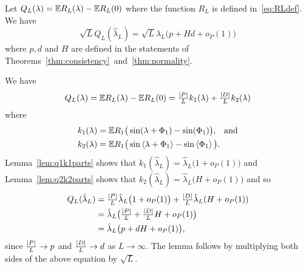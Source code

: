 \documentclass[journal]{IEEEtran}
\begin{document}
\begin{lemma}\label{lem:Qconv}
Let $Q_L(\lambda) = {\mathbb E} R_L(\lambda) - {\mathbb E} R_L(0)$ where the function $R_L$ is defined in~\eqref{eq:RLdef}.  We have
\[ 
\sqrt{L} Q_L(\hat{\lambda}_L) = \sqrt{L} \hat{\lambda}_L\big( p + Hd  + o_P(1) \big)
\]
where $p, d$ and $H$ are defined in the statements of Theorems~\ref{thm:consistency}~and~\ref{thm:normality}.
\end{lemma}
\begin{IEEEproof}
We have
\[
Q_L(\lambda) = {\mathbb E} R_L(\lambda) - {\mathbb E} R_L(0) = \tfrac{{\vert P \vert}}{L} k_1(\lambda) + \tfrac{{\vert D \vert}}{L} k_2(\lambda)
\]
where
\begin{align}
k_1(\lambda) &= {\mathbb E} R_1\big( \sin(\lambda + \Phi_1) - \sin(\Phi_1) \big), \;\;\; \text{and} \nonumber\\
k_2(\lambda) &= {\mathbb E} R_1\big( \sin\left\langle \lambda + \Phi_1 \right\rangle - \sin\left\langle \Phi_1 \right\rangle \big). \label{eq:k2def}
\end{align}
Lemma~\ref{lem:q1k1parts} shows that $k_1(\hat{\lambda}_L) = \hat{\lambda}_L\big(1 + o_P(1) \big)$ and Lemma~\ref{lem:q2k2parts} shows that $k_2(\hat{\lambda}_L) = \hat{\lambda}_L \big( H + o_P(1) \big)$ and so
\begin{align*}
Q_L(\hat{\lambda}_L) &=  \tfrac{{\vert P \vert}}{L} \hat{\lambda}_L \big( 1  + o_P(1)\big)  + \tfrac{{\vert D \vert}}{L} \hat{\lambda}_L ( H + o_P(1) ) \\
&= \hat{\lambda}_L \big( \tfrac{{\vert P \vert}}{L}  + \tfrac{{\vert D \vert}}{L} H + o_P(1) \big) \\
 &= \hat{\lambda}_L \big( p  + d H + o_P(1) \big),
 \end{align*}
since $\frac{{\vert P \vert}}{L} \rightarrow p$ and $\frac{{\vert D \vert}}{L} \rightarrow d$ as $L \rightarrow \infty$.  The lemma follows by multiplying both sides of the 
above equation by $\sqrt{L}$.

\end{IEEEproof}
\end{document}
